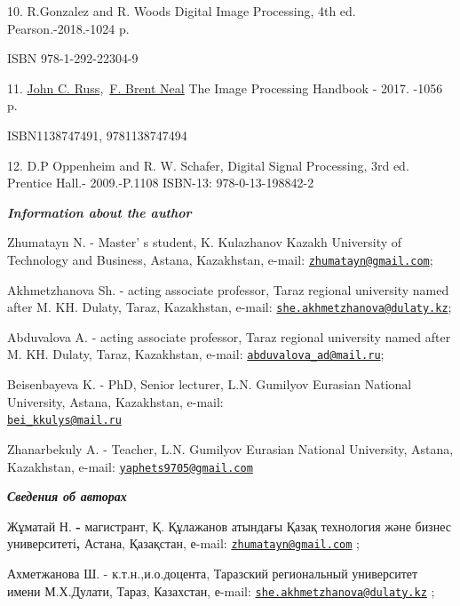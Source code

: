 \begin{references}
10. R.Gonzalez and R. Woods Digital Image Processing, 4th ed.
Pearson.-2018.-1024 p.

ISBN 978-1-292-22304-9

11.
\href{https://www.google.kz/search?hl=ru&tbo=p&tbm=bks&q=inauthor:\%22John+C.+Russ\%22}{John
C.
Russ},~\href{https://www.google.kz/search?hl=ru&tbo=p&tbm=bks&q=inauthor:\%22F.+Brent+Neal\%22}{F.
Brent Neal} The Image Processing Handbook - 2017. -1056 p.

ISBN1138747491, 9781138747494

12. D.P Oppenheim and R. W. Schafer, Digital Signal Processing, 3rd ed.
Prentice Hall.- 2009.-P.1108 ISBN-13: 978-0-13-198842-2
\end{references}

\begin{authorinfo}
\emph{{\bfseries Information about the author}}

Zhumatayn N. - Master' s student, K. Kulazhanov Kazakh
University of Technology and Business, Astana, Kazakhstan, e-mail:
\href{mailto:zhumatayn@gmail.com}{\nolinkurl{zhumatayn@gmail.com}};

Akhmetzhanova Sh. - acting associate professor, Taraz regional
university named after M. KH. Dulaty, Taraz, Kazakhstan, e-mail:
\href{mailto:she.akhmetzhanova@dulaty.kz}{\nolinkurl{she.akhmetzhanova@dulaty.kz}};

Abduvalova A. - acting associate professor, Taraz regional university
named after M. KH. Dulaty, Taraz, Kazakhstan, e-mail:
\href{mailto:abduvalova_ad@mail.ru}{\nolinkurl{abduvalova\_ad@mail.ru}};

Beisenbayeva K. - PhD, Senior lecturer, L.N. Gumilyov Eurasian National
University, Astana, Kazakhstan, e-mail:\\
\href{mailto:bei_kkulys@mail.ru}{\nolinkurl{bei\_kkulys@mail.ru}}

Zhanarbekuly A. - Teacher, L.N. Gumilyov Eurasian National University,
Astana, Kazakhstan, e-mail:
\href{mailto:yaphets9705@gmail.com}{\nolinkurl{yaphets9705@gmail.com}}

\emph{{\bfseries Сведения об авторах}}

Жұматай Н. {\bfseries -} магистрант, Қ. Құлажанов атындағы Қазақ технология
және бизнес университеті{\bfseries ,} Астана, Қазақстан, е-mail:
\href{mailto:zhumatayn@gmail.com}{\nolinkurl{zhumatayn@gmail.com}} ;

Ахметжанова Ш. - к.т.н.,и.о.доцента, Таразский региональный университет
имени М.Х.Дулати, Тараз, Казахстан, е-mail:
\href{mailto:she.akhmetzhanova@dulaty.kz}{\nolinkurl{she.akhmetzhanova@dulaty.kz}}
;


\end{authorinfo}

